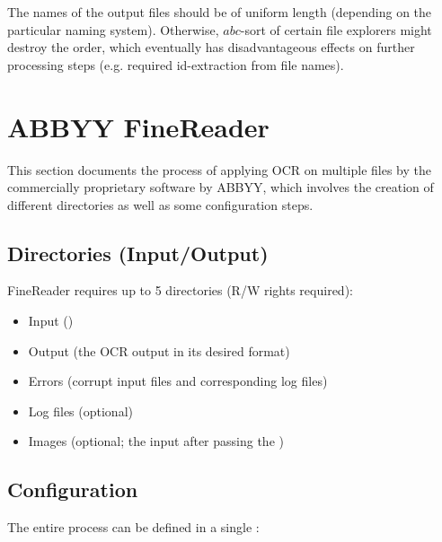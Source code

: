 The names of the output files should be of uniform length (depending on the particular naming system). Otherwise, $abc$-sort of certain file explorers might destroy the order, which eventually has disadvantageous effects on further processing steps (e.g. required id-extraction from file names).

\section{ABBYY FineReader}

This section documents the process of applying OCR on multiple files by the commercially proprietary software  by ABBYY, which involves the creation of different directories as well as some configuration steps.

\subsection{Directories (Input/Output)}

FineReader requires up to 5 directories (R/W rights required):

\vspace*{-0.1cm}
\begin{itemize}
\setlength\itemsep{0em}
\item Input ()
\item Output (the OCR output in its desired format)
\item Errors (corrupt input files and corresponding log files)
\item Log files (optional)
\item Images (optional; the input after passing the )
\end{itemize}


\subsection{Configuration}

The entire process can be defined in a single :

